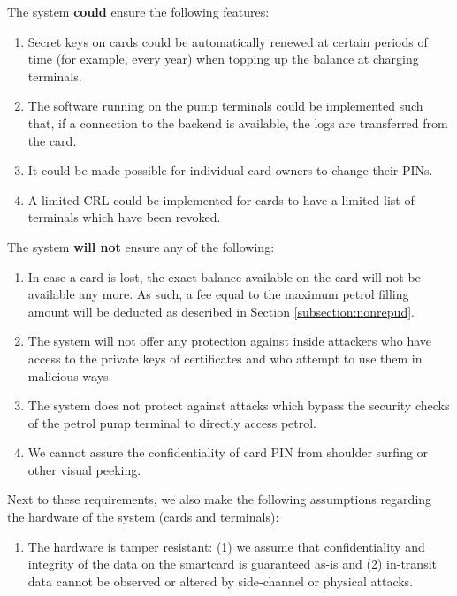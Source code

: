 The system {\bf could} ensure the following features:
\begin{enumerate}
  \item Secret keys on cards could be automatically renewed at certain periods of time (for example, every year) when topping up the balance at charging terminals.
  \item The software running on the pump terminals could be implemented such that, if a connection to the backend is available, the logs are transferred from the card.
  \item It could be made possible for individual card owners to change their PINs.
  \item A limited CRL could be implemented for cards to have a limited list of terminals which have been revoked.
\end{enumerate}

The system {\bf will not} ensure any of the following:
\begin{enumerate}
  \item In case a card is lost, the exact balance available on the card will not be available any more. As such, a fee equal to the maximum petrol filling amount will be deducted as described in Section \ref{subsection:nonrepud}.
  \item The system will not offer any protection against inside attackers who have access to the private keys of certificates and who attempt to use them in malicious ways.
  \item The system does not protect against attacks which bypass the security checks of the petrol pump terminal to directly access petrol.
  \item We cannot assure the confidentiality of card PIN from shoulder surfing or other visual peeking.
\end{enumerate}

Next to these requirements, we also make the following assumptions regarding the hardware of the system (cards and terminals):
\begin{enumerate}
  \item The hardware is tamper resistant: (1) we assume that confidentiality and integrity of the data on the smartcard is guaranteed as-is and (2) in-transit data cannot be observed or altered by side-channel or physical attacks.
\end{enumerate}